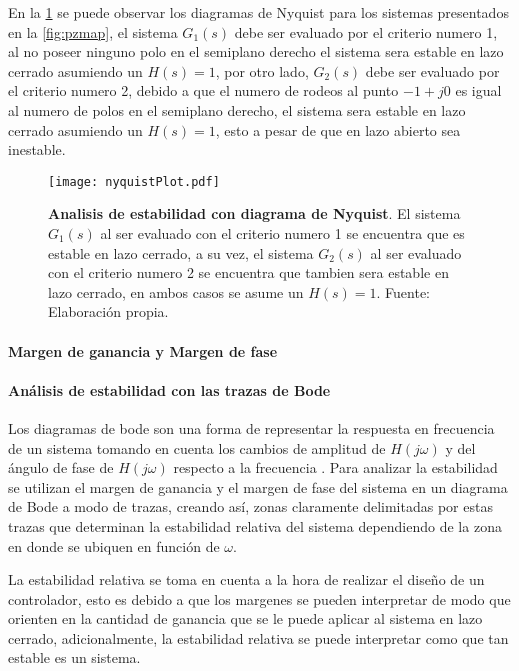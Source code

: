                 En la \cref{fig:nyquistPlot} se puede observar los diagramas de Nyquist para los sistemas presentados en la \cref{fig:pzmap}, el sistema $G_1(s)$ debe ser evaluado por el criterio numero 1, al no poseer ninguno polo en el semiplano derecho el sistema sera estable en lazo cerrado asumiendo un $H(s) = 1$, por otro lado, $G_2(s)$ debe ser evaluado por el criterio numero 2, debido a que el numero de rodeos al punto $-1 + j0$ es igual al numero de polos en el semiplano derecho, el sistema sera estable en lazo cerrado asumiendo un $H(s) = 1$, esto a pesar de que en lazo abierto sea inestable.

                \begin{figure}[htb]
                    \centering
                    \texttt{[image: nyquistPlot.pdf]}
                    \caption[Ejemplo de analisis de estabilidad con diagrama de Nyquist]{\textbf{Analisis de estabilidad con diagrama de Nyquist}. El sistema $G_1(s)$ al ser evaluado con el criterio numero 1 se encuentra que es estable en lazo cerrado, a su vez, el sistema $G_2(s)$ al ser evaluado con el criterio numero 2 se encuentra que tambien sera estable en lazo cerrado, en ambos casos se asume un $H(s) = 1$. Fuente: Elaboración propia.} 
                    \label{fig:nyquistPlot}
                \end{figure}
            
            \paragraph{Margen de ganancia y Margen de fase}
                
                
            \paragraph{Análisis de estabilidad con las trazas de Bode}

                Los diagramas de bode son una forma de representar la respuesta en frecuencia de un sistema tomando en cuenta los cambios de amplitud de $H(j\omega)$ y del ángulo de fase de $H(j\omega)$ respecto a la frecuencia \Parencite{nilsson1995circuitos}. Para analizar la estabilidad se utilizan el margen de ganancia y el margen de fase del sistema en un diagrama de Bode a modo de trazas, creando así, zonas claramente delimitadas por estas trazas que determinan la estabilidad relativa del sistema dependiendo de la zona en donde se ubiquen en función de $\omega$.

                La estabilidad relativa se toma en cuenta a la hora de realizar el diseño de un controlador, esto es debido a que los margenes se pueden interpretar de modo que orienten en la cantidad de ganancia que se le puede aplicar al sistema en lazo cerrado, adicionalmente, la estabilidad relativa se puede interpretar como que tan estable es un sistema.  


                

                
